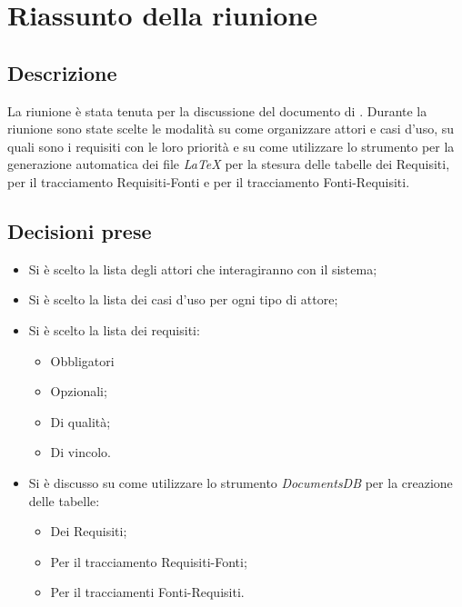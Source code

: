 \section{Riassunto della riunione}
\subsection{Descrizione}

La riunione è stata tenuta per la discussione del documento di \AdR. Durante la riunione sono state scelte le modalità su come organizzare attori e casi d'uso, su quali sono i requisiti con le loro priorità e su come utilizzare lo strumento per la generazione automatica dei file \textit{\LaTeX {}} per la stesura delle tabelle dei Requisiti, per il tracciamento Requisiti-Fonti e per il tracciamento Fonti-Requisiti.

\subsection{Decisioni prese}
\begin{itemize}
\item Si è scelto la lista degli attori che interagiranno con il sistema;
\item Si è scelto la lista dei casi d'uso per ogni tipo di attore;
\item Si è scelto la lista dei requisiti:  
	\begin{itemize}
		\item Obbligatori  
		\item Opzionali;
		\item Di qualità; 
		\item Di vincolo.
	\end{itemize}
\item Si è discusso su come utilizzare lo strumento \textit{DocumentsDB} per la creazione delle tabelle:
	\begin{itemize}
		\item Dei Requisiti;
		\item Per il tracciamento Requisiti-Fonti;
		\item Per il tracciamenti Fonti-Requisiti.
	\end{itemize}
\end{itemize}